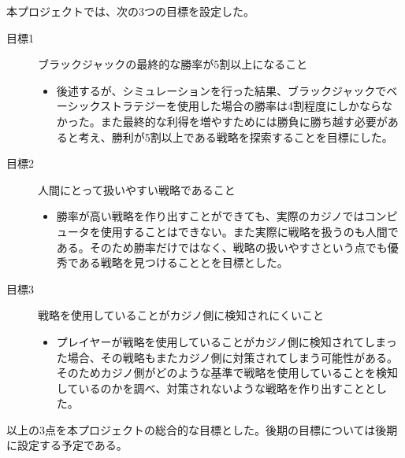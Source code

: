 本プロジェクトでは、次の3つの目標を設定した。
\begin{description}
\item[目標1] ブラックジャックの最終的な勝率が5割以上になること
\begin{itemize}
\item{後述するが、シミュレーションを行った結果、ブラックジャックでベーシックストラテジーを使用した場合の勝率は4割程度にしかならなかった。また最終的な利得を増やすためには勝負に勝ち越す必要があると考え、勝利が5割以上である戦略を探索することを目標にした。}
\end{itemize}
\item[目標2] 人間にとって扱いやすい戦略であること
\begin{itemize}
\item{勝率が高い戦略を作り出すことができても、実際のカジノではコンピュータを使用することはできない。また実際に戦略を扱うのも人間である。そのため勝率だけではなく、戦略の扱いやすさという点でも優秀である戦略を見つけることとを目標とした。}
\end{itemize}
\item[目標3] 戦略を使用していることがカジノ側に検知されにくいこと
\begin{itemize}
\item{プレイヤーが戦略を使用していることがカジノ側に検知されてしまった場合、その戦略もまたカジノ側に対策されてしまう可能性がある。そのためカジノ側がどのような基準で戦略を使用していることを検知しているのかを調べ、対策されないような戦略を作り出すこととした。}
\end{itemize}
\end{description}
以上の3点を本プロジェクトの総合的な目標とした。後期の目標については後期に設定する予定である。
